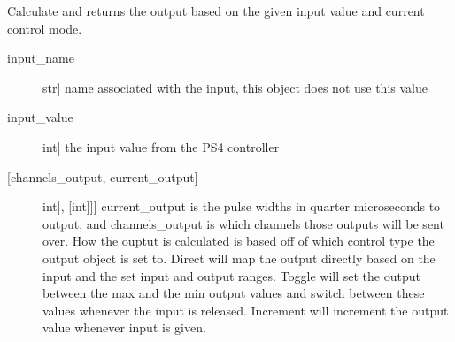 \documentclass[letterpaper,10pt,english]{sphinxmanual}
\begin{document}
\begin{fulllineitems}
\begin{fulllineitems}
\begin{description}
\end{description}

\end{fulllineitems}


\begin{fulllineitems}
\label{\detokenize{generic:AnalogOutputObject.AnalogOutputObject.get_output}}
\sphinxAtStartPar
Calculate and returns the output based on the given input value and current control mode.

\sphinxAtStartPar
{}
\begin{description}
\item[{input\_name}] \leavevmode{[}str{]}
\sphinxAtStartPar
name associated with the input, this object does not use this value

\item[{input\_value}] \leavevmode{[}int{]}
\sphinxAtStartPar
the input value from the PS4 controller

\end{description}

\sphinxAtStartPar
{}
\begin{description}
\item[{{[}channels\_output, current\_output{]}}] \leavevmode{[}{[}{[}int{]}, {[}int{]}{]}{]}
\sphinxAtStartPar
current\_output is the pulse widths in quarter microseconds to output, and channels\_output
is which channels those outputs will be sent over. How the ouptut is calculated is based
off of which control type the output object is set to. Direct will map the output directly
based on the input and the set input and output ranges. Toggle will set the output between
the max and the min output values and switch between these values whenever the input is
released. Increment will increment the output value whenever input is given.

\end{description}

\end{fulllineitems}



\end{fulllineitems}
\end{document}
